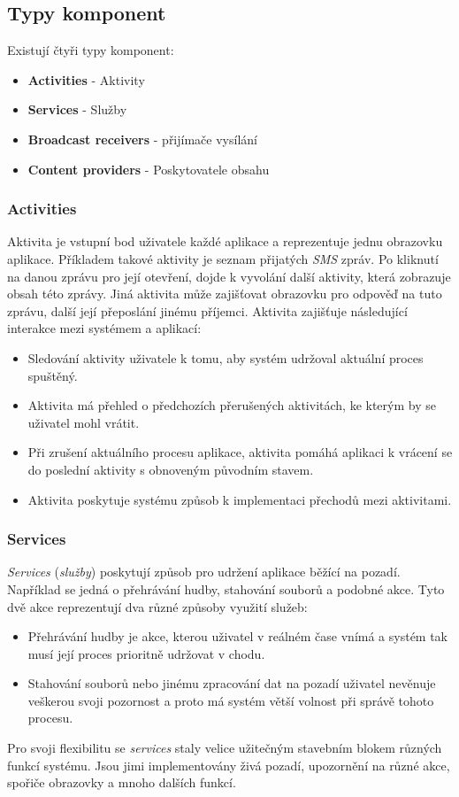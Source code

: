     \subsection{Typy komponent}
    Existují čtyři typy komponent:
    \begin{itemize}
        \item \textbf{Activities} - Aktivity
        \item \textbf{Services} - Služby
        \item \textbf{Broadcast receivers} - přijímače vysílání
        \item \textbf{Content providers} - Poskytovatele obsahu
    \end{itemize}

        \subsubsection{Activities}
        Aktivita je vstupní bod uživatele každé aplikace a reprezentuje jednu obrazovku aplikace. Příkladem takové aktivity je seznam přijatých \emph{SMS} zpráv. Po kliknutí na danou zprávu pro její otevření, dojde k vyvolání další aktivity, která zobrazuje obsah této zprávy. Jiná aktivita může zajišťovat obrazovku pro odpověď na tuto zprávu, další její přeposlání jinému příjemci. Aktivita zajišťuje následující interakce mezi systémem a aplikací:
        \begin{itemize}
            \item Sledování aktivity uživatele k tomu, aby systém udržoval aktuální proces spuštěný.
            \item Aktivita má přehled o předchozích přerušených aktivitách, ke kterým by se uživatel mohl vrátit.
            \item Při zrušení aktuálního procesu aplikace, aktivita pomáhá aplikaci k vrácení se do poslední aktivity s obnoveným původním stavem.
            \item Aktivita poskytuje systému způsob k implementaci přechodů mezi aktivitami.
        \end{itemize}

        \subsubsection{Services}
        \emph{Services} (\emph{služby}) poskytují způsob pro udržení aplikace běžící na pozadí. Například se jedná o přehrávání hudby, stahování souborů a podobné akce. Tyto dvě akce reprezentují dva různé způsoby využití služeb:
        \begin{itemize}
            \item Přehrávání hudby je akce, kterou uživatel v reálném čase vnímá a systém tak musí její proces prioritně udržovat v chodu.
            \item Stahování souborů nebo jinému zpracování dat na pozadí uživatel nevěnuje veškerou svoji pozornost a proto má systém větší volnost při správě tohoto procesu.
        \end{itemize}
        Pro svoji flexibilitu se \emph{services} staly velice užitečným stavebním blokem různých funkcí systému. Jsou jimi implementovány živá pozadí, upozornění na různé akce, spořiče obrazovky a mnoho dalších funkcí.
        

